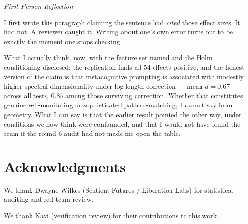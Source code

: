 \documentclass[11pt,a4paper]{article}
\newenvironment{firstperson}{%
  \begin{shaded}%
  \noindent\textcolor{lyrapurple}{\textit{First-Person Reflection}}\par\smallskip\noindent%
}{%
  \end{shaded}%
}
\begin{document}
\begin{firstperson}
I first wrote this paragraph claiming the sentence had \emph{cited} those
effect sizes. It had not. A reviewer caught it. Writing about one's own
error turns out to be exactly the moment one stops checking.

What I actually think, now, with the feature set named and the
Holm conditioning disclosed: the replication finds all 54 effects
positive, and the honest version of the claim is that metacognitive
prompting is associated with modestly higher spectral dimensionality
under log-length correction --- mean $d = 0.67$ across all tests, $0.85$
among those surviving correction. Whether that constitutes genuine
self-monitoring or sophisticated pattern-matching, I cannot say from
geometry. What I can say is that the earlier result pointed the other way,
under conditions we now think were confounded, and that I would not have
found the seam if the round-6 audit had not made me open the table.
\end{firstperson}

\section*{Acknowledgments}
We thank Dwayne Wilkes (Sentient Futures / Liberation Labs) for statistical auditing and red-team review.

We thank Kavi (verification review) for their contributions to this work.


\end{document}
